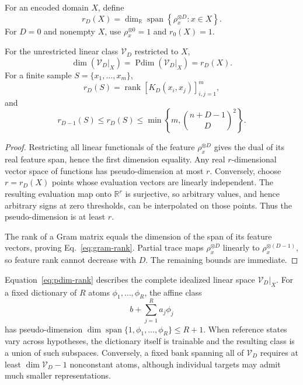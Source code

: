 \documentclass[pdflatex,sn-mathphys,NameDate,iicol]{sn-jnl}
\newcommand{\rank}{\operatorname{rank}}
\newcommand{\R}{\mathbb{R}}
\newcommand{\Pdim}{\operatorname{Pdim}}
\newcommand{\cV}{\mathcal{V}}
\begin{document}
\begin{definition}
For an encoded domain $X$, define
\begin{equation}
  r_D(X)
  =
  \dim_{\R}
  \operatorname{span}
  \left\{\rho_x^{\otimes D}:x\in X\right\}.
  \label{eq:feature-rank}
\end{equation}
For $D=0$ and nonempty $X$, use
$\rho_x^{\otimes0}=1$ and $r_0(X)=1$.
\end{definition}

\begin{theorem}
\label{thm:restricted-rank}
For the unrestricted linear class $\cV_D$ restricted to $X$,
\begin{equation}
  \dim(\cV_D|_X)
  =
  \Pdim(\cV_D|_X)
  =
  r_D(X).
  \label{eq:pdim-rank}
\end{equation}
For a finite sample $S=\{x_1,\ldots,x_m\}$,
\begin{equation}
  r_D(S)
  =
  \rank\left[K_D(x_i,x_j)\right]_{i,j=1}^{m},
  \label{eq:gram-rank}
\end{equation}
and
\begin{equation}
  r_{D-1}(S)\le r_D(S)
  \le
  \min\left\{
    m,\binom{n+D-1}{D}^{2}
  \right\}.
  \label{eq:rank-monotone}
\end{equation}
\end{theorem}

\begin{proof}
Restricting all linear functionals of the feature
$\rho_x^{\otimes D}$ gives the dual of its real feature span, hence the
first dimension equality. Any real $r$-dimensional vector space of functions
has pseudo-dimension at most $r$. Conversely, choose $r=r_D(X)$ points whose
evaluation vectors are linearly independent. The resulting evaluation map
onto $\R^r$ is surjective, so arbitrary values, and hence arbitrary signs at
zero thresholds, can be interpolated on those points. Thus the
pseudo-dimension is at least $r$.

The rank of a Gram matrix equals the dimension of the span of its feature
vectors, proving Eq.~\eqref{eq:gram-rank}. Partial trace maps
$\rho_x^{\otimes D}$ linearly to $\rho_x^{\otimes(D-1)}$, so feature rank
cannot decrease with $D$. The remaining bounds are immediate.
\end{proof}

\begin{remark}
Equation~\eqref{eq:pdim-rank} describes the complete idealized linear space
$\cV_D|_X$. For a fixed dictionary of $R$ atoms
$\phi_1,\ldots,\phi_R$, the affine class
\begin{equation*}
 b+\sum_{j=1}^{R}a_j\phi_j
\end{equation*}
has pseudo-dimension
$\dim\operatorname{span}\{1,\phi_1,\ldots,\phi_R\}\le R+1$.
When reference states vary across hypotheses, the dictionary itself is
trainable and the resulting class is a union of such subspaces. Conversely,
a fixed bank spanning all of $\cV_D$ requires at least
$\dim\cV_D-1$ nonconstant atoms, although individual targets may admit much
smaller representations.
\end{remark}
\end{document}

